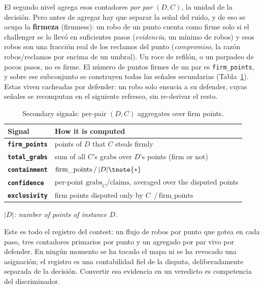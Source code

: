 El segundo nivel agrega esos contadores \emph{por par} $(D, C)$, la unidad de la decisión.
Pero antes de agregar hay que separar la señal del ruido, y de eso se ocupa la
\textbf{firmeza} (\foreignlanguage{english}{firmness}): un robo de un punto cuenta como firme
solo si el challenger se lo llevó en suficientes pasos (\emph{evidencia}, un mínimo de robos)
y esos robos son una fracción real de los reclamos del punto (\emph{compromiso}, la razón
robos/reclamos por encima de un umbral). Un roce de refilón, o un parpadeo de pocos pasos, no
es firme. El número de puntos firmes de un par es \texttt{firm\_points}, y sobre ese
subconjunto se construyen todas las señales secundarias (Tabla~\ref{tab:contest_secondary}).
Estas viven cacheadas por defender: un robo solo ensucia a su defender, cuyas señales se
recomputan en el siguiente refresco, sin re-derivar el resto.

\begin{table}[ht]
  \centering
  \small
  \begin{threeparttable}
  \renewcommand{\arraystretch}{1.5}
  \begin{tabular}{@{}l p{11.6cm}@{}}
    \toprule
    \textbf{Signal} & \textbf{How it is computed} \\
    \midrule
    \textbf{\texttt{firm\_points}} & points of $D$ that $C$ steals firmly \\
    \textbf{\texttt{total\_grabs}} & sum of all $C$'s grabs over $D$'s points (firm or not) \\
    \textbf{\texttt{containment}}  & $\mathrm{firm\_points}\,/\,|D|\tnote{*}$ \\
    \textbf{\texttt{confidence}}   & per-point $\mathrm{grabs}_C/\mathrm{claims}$, averaged over the disputed points \\
    \textbf{\texttt{exclusivity}}  & firm points disputed only by $C$ $\,/\,\mathrm{firm\_points}$ \\
    \bottomrule
  \end{tabular}
  \begin{tablenotes}
    \footnotesize\item[*]\itshape $|D|$: number of points of instance $D$.
  \end{tablenotes}
  \end{threeparttable}
  \caption{Secondary signals: per-pair $(D,C)$ aggregates over firm points.}
  \label{tab:contest_secondary}
\end{table}

Este es todo el registro del contest: un flujo de robos por punto que gotea en cada paso,
tres contadores primarios por punto y un agregado por par vivo por defender. En ningún
momento se ha tocado el mapa ni se ha revocado una asignación; el registro es una
contabilidad fiel de la disputa, deliberadamente separada de la decisión. Convertir esa
evidencia en un veredicto es competencia del discriminador.

